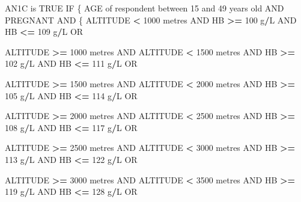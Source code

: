 \documentclass[12pt,a4paper]{article}
\newenvironment{Shaded}{\begin{snugshade}}{\end{snugshade}}
\newcommand{\DecValTok}[1]{\textcolor[rgb]{0.00,0.00,0.81}{#1}}
\newcommand{\NormalTok}[1]{#1}
\newcommand{\OperatorTok}[1]{\textcolor[rgb]{0.81,0.36,0.00}{\textbf{#1}}}
\newcommand{\OtherTok}[1]{\textcolor[rgb]{0.56,0.35,0.01}{#1}}
\newcommand{\StringTok}[1]{\textcolor[rgb]{0.31,0.60,0.02}{#1}}
\begin{document}
\begin{Shaded}
\begin{Highlighting}[]
\NormalTok{AN1C is }\OtherTok{TRUE}\NormalTok{ IF}
\NormalTok{  \{}
\NormalTok{    AGE of respondent between }\DecValTok{15}\NormalTok{ and }\DecValTok{49}\NormalTok{ years old AND PREGNANT AND}
\NormalTok{      \{}
\NormalTok{        ALTITUDE }\OperatorTok{<}\StringTok{ }\DecValTok{1000}\NormalTok{ metres AND HB }\OperatorTok{>=}\StringTok{ }\DecValTok{100}\NormalTok{ g}\OperatorTok{/}\NormalTok{L AND HB }\OperatorTok{<=}\StringTok{ }\DecValTok{109}\NormalTok{ g}\OperatorTok{/}\NormalTok{L OR}
     
\NormalTok{        ALTITUDE }\OperatorTok{>=}\StringTok{ }\DecValTok{1000}\NormalTok{ metres AND ALTITUDE }\OperatorTok{<}\StringTok{ }\DecValTok{1500}\NormalTok{ metres AND  }
\NormalTok{          HB }\OperatorTok{>=}\StringTok{ }\DecValTok{102}\NormalTok{ g}\OperatorTok{/}\NormalTok{L AND HB }\OperatorTok{<=}\StringTok{ }\DecValTok{111}\NormalTok{ g}\OperatorTok{/}\NormalTok{L OR}
          
\NormalTok{        ALTITUDE }\OperatorTok{>=}\StringTok{ }\DecValTok{1500}\NormalTok{ metres AND ALTITUDE }\OperatorTok{<}\StringTok{ }\DecValTok{2000}\NormalTok{ metres AND  }
\NormalTok{          HB }\OperatorTok{>=}\StringTok{ }\DecValTok{105}\NormalTok{ g}\OperatorTok{/}\NormalTok{L AND HB }\OperatorTok{<=}\StringTok{ }\DecValTok{114}\NormalTok{ g}\OperatorTok{/}\NormalTok{L OR}
          
\NormalTok{        ALTITUDE }\OperatorTok{>=}\StringTok{ }\DecValTok{2000}\NormalTok{ metres AND ALTITUDE }\OperatorTok{<}\StringTok{ }\DecValTok{2500}\NormalTok{ metres AND  }
\NormalTok{          HB }\OperatorTok{>=}\StringTok{ }\DecValTok{108}\NormalTok{ g}\OperatorTok{/}\NormalTok{L AND HB }\OperatorTok{<=}\StringTok{ }\DecValTok{117}\NormalTok{ g}\OperatorTok{/}\NormalTok{L OR}
          
\NormalTok{        ALTITUDE }\OperatorTok{>=}\StringTok{ }\DecValTok{2500}\NormalTok{ metres AND ALTITUDE }\OperatorTok{<}\StringTok{ }\DecValTok{3000}\NormalTok{ metres AND  }
\NormalTok{          HB }\OperatorTok{>=}\StringTok{ }\DecValTok{113}\NormalTok{ g}\OperatorTok{/}\NormalTok{L AND HB }\OperatorTok{<=}\StringTok{ }\DecValTok{122}\NormalTok{ g}\OperatorTok{/}\NormalTok{L OR}
          
\NormalTok{        ALTITUDE }\OperatorTok{>=}\StringTok{ }\DecValTok{3000}\NormalTok{ metres AND ALTITUDE }\OperatorTok{<}\StringTok{ }\DecValTok{3500}\NormalTok{ metres AND  }
\NormalTok{          HB }\OperatorTok{>=}\StringTok{ }\DecValTok{119}\NormalTok{ g}\OperatorTok{/}\NormalTok{L AND HB }\OperatorTok{<=}\StringTok{ }\DecValTok{128}\NormalTok{ g}\OperatorTok{/}\NormalTok{L OR}


\end{Highlighting}
\end{Shaded}
\end{document}
